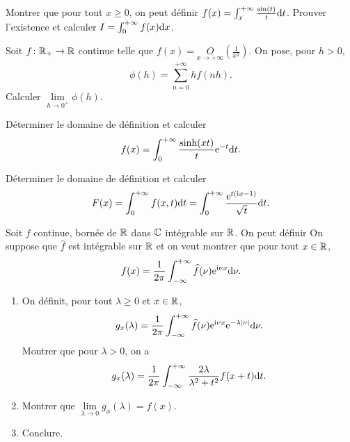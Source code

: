 \documentclass[12pt]{article}
\begin{document}
\begin{exercise}
    Montrer que pour tout $x\geqslant0$, on peut définir $f(x)=\int_{x}^{+\infty}\frac{\sin(t)}{t}\mathrm{d} t$. Prouver l'existence et calculer $I=\int_{0}^{+\infty}f(x)\mathrm{d} x$.
\end{exercise}

\begin{exercise}
    Soit $f\colon\mathbb{R}_{+}\to\mathbb{R}$ continue telle que $f(x)=\underset{x\to+\infty}{O}\left(\frac{1}{x^{2}}\right)$. On pose, pour $h>0$, 
    \begin{equation}
        \phi(h)=\sum_{n=0}^{+\infty}hf(nh).
    \end{equation}
    Calculer $\lim\limits_{h\to0^{+}}\phi(h)$.
\end{exercise}

\begin{exercise}
    Déterminer le domaine de définition et calculer 
    \begin{equation}
        f(x)=\int_{0}^{+\infty}\frac{\sinh(xt)}{t}\mathrm{e}^{-t}\mathrm{d} t.
    \end{equation}
\end{exercise}

\begin{exercise}
    Déterminer le domaine de définition et calculer 
    \begin{equation}
        F(x)=\int_{0}^{+\infty}f(x,t)\mathrm{d} t=\int_{0}^{+\infty}\frac{\mathrm{e}^{t(\mathrm{i} x-1)}}{\sqrt{t}}\mathrm{d} t.
    \end{equation}
\end{exercise}

\begin{exercise}
    Soit $f$ continue, bornée de $\mathbb{R}$ dans $\mathbb{C}$ intégrable sur $\mathbb{R}$. On peut définir 
    On suppose que $\widehat{f}$ est intégrable sur $\mathbb{R}$ et on veut montrer que pour tout $x\in\mathbb{R}$,
    \begin{equation}
        f(x)=\frac{1}{2\pi}\int_{-\infty}^{+\infty}\widehat{f}(\nu)\mathrm{e}^{\mathrm{i}\nu x}\mathrm{d}\nu.
    \end{equation}

    \begin{enumerate}
        \item On définit, pour tout $\lambda\geqslant0$ et $x\in\mathbb{R}$,
        \begin{equation}
            g_x(\lambda)=\frac{1}{2\pi}\int_{-\infty}^{+\infty}\widehat{f}(\nu)\mathrm{e}^{\mathrm{i}\nu x}\mathrm{e}^{-\lambda\left\lvert \nu\right\rvert}\mathrm{d}\nu.
        \end{equation}
        Montrer que pour $\lambda>0$, on a 
        \begin{equation}
            g_x(\lambda)=\frac{1}{2\pi}\int_{-\infty}^{+\infty}\frac{2\lambda}{\lambda^{2}+t^{2}}f(x+t)\mathrm{d} t.
        \end{equation}
        \item Montrer que $\lim\limits_{\lambda\to0}g_x(\lambda)=f(x)$.
        \item Conclure.
    \end{enumerate}
\end{exercise}
\end{document}

